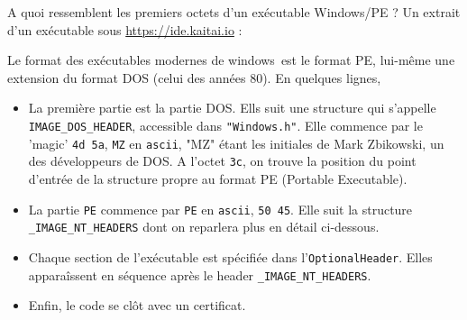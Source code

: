 \documentclass{book}
\newcommand{\code}[1]{\texttt{#1}}
\newcommand{\Windows}{{\sc windows}}
\begin{document}
A quoi ressemblent les premiers octets d'un exécutable Windows/PE ? Un extrait d'un exécutable sous \url{https://ide.kaitai.io} : 

\noindent
{}

Le format des exécutables modernes de \Windows\ est le format PE, lui-même une extension du format DOS (celui des années 80). En quelques lignes, 

\begin{itemize}
	\item La première partie est la partie DOS. Ells suit une structure qui s'appelle \code{IMAGE\_DOS\_HEADER}, accessible dans \code{"Windows.h"}. Elle commence par le 'magic' \code{4d 5a}, \code{MZ} en \code{ascii}, "MZ" étant les initiales de Mark Zbikowski, un des développeurs de DOS.  A l'octet \code{3c}, on trouve la position du point d'entrée de la structure propre au format PE (Portable Executable).
	\item La partie \code{PE} commence par \code{PE} en \code{ascii}, \code{50 45}. Elle suit la structure \code{\_IMAGE\_NT\_HEADERS} dont on reparlera plus en détail ci-dessous.
	\item Chaque section de l'exécutable est spécifiée dans l'\code{OptionalHeader}. Elles apparaîssent en séquence après le header \code{\_IMAGE\_NT\_HEADERS}. 
	\item Enfin, le code se clôt avec un certificat.  
\end{itemize}
\end{document}
